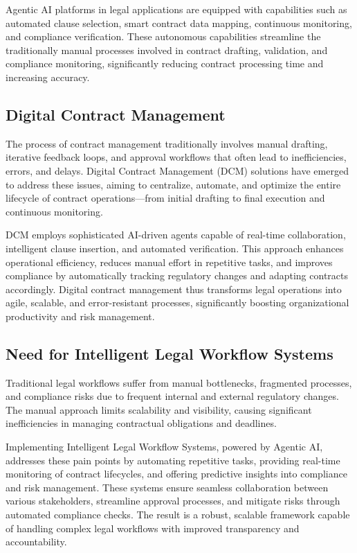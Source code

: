 Agentic AI platforms in legal applications are equipped with capabilities such as automated clause selection, smart contract data mapping, continuous monitoring, and compliance verification. These autonomous capabilities streamline the traditionally manual processes involved in contract drafting, validation, and compliance monitoring, significantly reducing contract processing time and increasing accuracy.

\subsection{Digital Contract Management}
The process of contract management traditionally involves manual drafting, iterative feedback loops, and approval workflows that often lead to inefficiencies, errors, and delays. Digital Contract Management (DCM) solutions have emerged to address these issues, aiming to centralize, automate, and optimize the entire lifecycle of contract operations—from initial drafting to final execution and continuous monitoring.\mynewline

DCM employs sophisticated AI-driven agents capable of real-time collaboration, intelligent clause insertion, and automated verification. This approach enhances operational efficiency, reduces manual effort in repetitive tasks, and improves compliance by automatically tracking regulatory changes and adapting contracts accordingly. Digital contract management thus transforms legal operations into agile, scalable, and error-resistant processes, significantly boosting organizational productivity and risk management.

\subsection{Need for Intelligent Legal Workflow Systems}
Traditional legal workflows suffer from manual bottlenecks, fragmented processes, and compliance risks due to frequent internal and external regulatory changes. The manual approach limits scalability and visibility, causing significant inefficiencies in managing contractual obligations and deadlines.\mynewline

Implementing Intelligent Legal Workflow Systems, powered by Agentic AI, addresses these pain points by automating repetitive tasks, providing real-time monitoring of contract lifecycles, and offering predictive insights into compliance and risk management. These systems ensure seamless collaboration between various stakeholders, streamline approval processes, and mitigate risks through automated compliance checks. The result is a robust, scalable framework capable of handling complex legal workflows with improved transparency and accountability.

